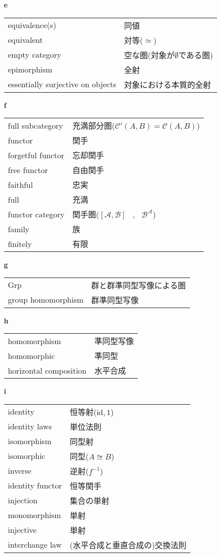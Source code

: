 \documentclass[dvipdfmx]{jsarticle}
\begin{document}
\textbf{e}

  \begin{tabular}{ll}
    equivalence(s) & 同値 \\
    equivalent & 対等($\simeq$) \\
    empty category & 空な圏(対象が$\emptyset$である圏) \\
    epimorphism & 全射 \\
    essentially surjective on objects & 対象における本質的全射 \\
  \end{tabular}

\textbf{f}

  \begin{tabular}{ll}
    full subcategory & 充満部分圏($\mathscr{C}'(A,B) = \mathscr{C}(A,B)$) \\
    functor & 関手 \\
    forgetful functor & 忘却関手 \\
    free functor & 自由関手 \\
    faithful & 忠実 \\
    full & 充満 \\
    functor category & 関手圏($[\mathscr{A},\mathscr{B}]$ \, , \, $\mathscr{B^{\mathscr{A}}}$) \\
    family & 族 \\
    finitely & 有限 \\
  \end{tabular}

\textbf{g}

  \begin{tabular}{ll}
    Grp & 群と群準同型写像による圏 \\
    group homomorphism & 群準同型写像 \\
  \end{tabular}

\textbf{h}

  \begin{tabular}{ll}
    homomorphism & 準同型写像 \\
    homomorphic & 準同型 \\
    horizontal composition & 水平合成 \\
  \end{tabular}

\textbf{i}

  \begin{tabular}{ll}
    identity & 恒等射($\mathrm{id},1$) \\
    identity laws & 単位法則 \\
    isomorphism & 同型射 \\
    isomorphic & 同型($A \cong B$) \\
    inverse & 逆射($f^{-1}$) \\
    identity functor & 恒等関手 \\
    injection & 集合の単射 \\
    monomorphism & 単射 \\
    injective & 単射 \\
    interchange law & (水平合成と垂直合成の)交換法則 \\
  \end{tabular}
\end{document}
